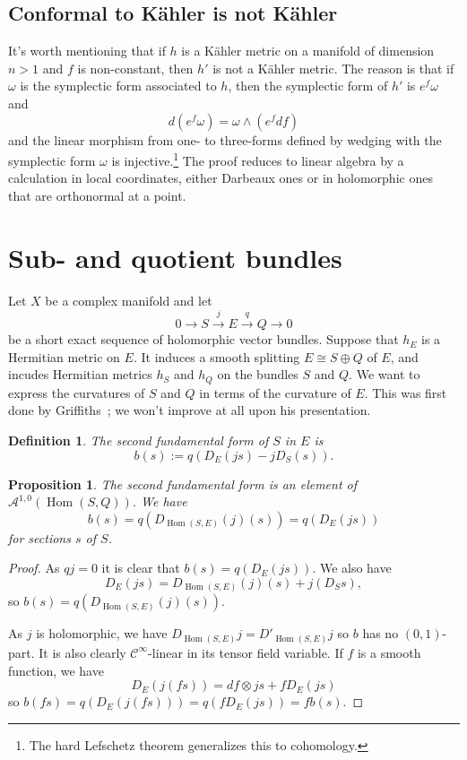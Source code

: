 \documentclass[10pt,a4paper]{article}
\newtheorem{prop}[theo]{Proposition}
\newtheorem{defi}[theo]{Definition}
\newtheorem*{proof}{Proof}
\newcommand{\cc}[1]{\mathcal{#1}}
\DeclareMathOperator{\Hom}{Hom}
\begin{document}
\subsection{Conformal to K\"ahler is not K\"ahler}
\label{sec:org7b1cfdf}

It's worth mentioning that if \(h\) is a K\"ahler metric on a manifold of dimension \(n > 1\) and \(f\) is non-constant, then \(h'\) is not a K\"ahler metric. The reason is that if \(\omega\) is the symplectic form associated to \(h\), then the symplectic form of \(h'\) is \(e^f \omega\) and
$$
d(e^f \omega) = \omega \wedge (e^f df)
$$
and the linear morphism from one- to three-forms defined by wedging with the symplectic form \(\omega\) is injective.\footnote{The hard Lefschetz theorem generalizes this to cohomology.}
The proof reduces to linear algebra by a calculation in local coordinates, either Darbeaux ones or in holomorphic ones that are orthonormal at a point.


\section{Sub- and quotient bundles}
\label{sec:sub-quotient}

Let $X$ be a complex manifold and let
\[
0 \longrightarrow
S \stackrel{j}{\longrightarrow}
E \stackrel{q}{\longrightarrow}
Q \longrightarrow
0
\]
be a short exact sequence of holomorphic vector bundles. Suppose that $h_E$ is a Hermitian metric on $E$. It induces a smooth splitting $E \cong S \oplus Q$ of $E$, and incudes Hermitian metrics $h_S$ and $h_Q$ on the bundles $S$ and $Q$. We want to express the curvatures of $S$ and $Q$ in terms of the curvature of $E$. This was first done by Griffiths~\cite{griffiths1965hermitian}; we won't improve at all upon his presentation.


\begin{defi}
The \emph{second fundamental form} of $S$ in $E$ is
\[
b(s) := q(D_E(js) - jD_S(s)).
\]
\end{defi}

\begin{prop}
\label{prop:second-fundamental-form}
The second fundamental form is an element of $\cc A^{1,0}(\Hom(S,Q))$.
We have
\[
b(s)
= q(D_{\Hom(S,E)}(j)(s))
= q(D_E(js))
\]
for sections $s$ of $S$.
\end{prop}

\begin{proof}
As $qj = 0$ it is clear that $b(s) = q(D_E(js))$. We also have
\[
D_E(js) = D_{\Hom(S,E)}(j)(s) + j(D_Ss),
\]
so $b(s) = q(D_{\Hom(S,E)}(j)(s))$.

As $j$ is holomorphic, we have $D_{\Hom(S,E)}j = D'_{\Hom(S,E)}j$ so $b$ has no $(0,1)$-part. It is also clearly $\cc C^\infty$-linear in its tensor field variable. If $f$ is a smooth function, we have
\[
D_E(j(fs))
= df \otimes js + f D_E(js)
\]
so $b(fs) = q(D_E(j(fs))) = q(f D_E(js)) = fb(s)$.
\end{proof}
\end{document}
